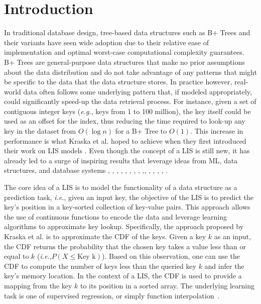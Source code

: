 \documentclass[sigconf]{acmart}
\newcommand{\ie}[0]{\emph{i.e.},\xspace}
\newcommand{\eg}[0]{\emph{e.g.},\xspace}
\begin{document}


\maketitle

\section{Introduction}

In traditional database design, tree-based data structures such as B+ Trees and their variants have seen wide adoption due to their relative ease of implementation and optimal worst-case computational complexity guarantees. B+ Trees are general-purpose data structures that make no prior assumptions about the data distribution and do not take advantage of any patterns that might be specific to the data that the data structure stores. In practice however, real-world data often follows some underlying pattern that, if modeled appropriately, could significantly speed-up the data retrieval process. For instance, given a set of contiguous integer keys (\eg keys from 1 to 100 million), 
the key itself could be used as an offset for the index, thus reducing the time required to look-up any key in the dataset from  $O(\log n)$ for a B+ Tree to $O(1)$. This increase in performance is what Kraska et al. hoped to achieve when they first introduced their work on \ac{LIS} models \cite{RN385}. Even though the concept of a \ac{LIS} is still new, it has already led to a surge of inspiring results that leverage ideas from \ac{ML}, data structures, and database systems \cite{RN388}, \cite{RN417}, \cite{RN408}, \cite{RN455}, \cite{RN416}, \cite{RN453}, \cite{RN414}, \cite{RN407}, \cite{RN457},\cite{RN405}, \cite{RN400}, \cite{RN406}, \cite{RN404}, \cite{RN410}, \cite{RN429}. 


The core idea of a \ac{LIS} is to model the functionality of a data structure as a prediction task, \ie given an input key, the objective of the \ac{LIS} is to predict the key's position in a key-sorted collection of key-value pairs. This approach allows the use of continuous functions to encode the data and leverage learning algorithms to approximate key lookup. Specifically, the approach proposed by Kraska et al. \cite{RN385} is to approximate the \ac{CDF} of the keys. Given a key $k$ as an input, the \ac{CDF} returns the probability that the chosen key takes a value less than or equal to $k$ (\ie $P(X \le \text{Key k})$).  
%
Based on this observation, one can use the \ac{CDF} to compute the number of keys less than the queried key $k$ and infer the key's memory location. In the context of a \ac{LIS}, the \ac{CDF} is used to provide a mapping from the key $k$ to its position in a sorted array. The underlying learning task is one of supervised regression, or simply function interpolation~\cite{RN408}.
\end{document}
